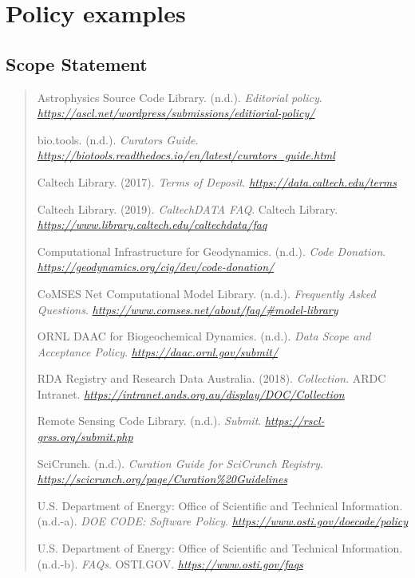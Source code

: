 \documentclass[]{article}
\begin{document}
\newpage
\section{Policy examples}\label{policy-examples}

\subsection{Scope Statement}\label{scope-statement}

\begin{quote}
Astrophysics Source Code Library. (n.d.). \emph{Editorial policy}.
\href{https://ascl.net/wordpress/submissions/editiorial-policy/}{\emph{https://ascl.net/wordpress/submissions/editiorial-policy/}}

bio.tools. (n.d.). \emph{Curators Guide}.
\href{https://biotools.readthedocs.io/en/latest/curators_guide.html}{\emph{https://biotools.readthedocs.io/en/latest/curators\_guide.html}}

Caltech Library. (2017). \emph{Terms of Deposit}.
\href{https://data.caltech.edu/terms}{\emph{https://data.caltech.edu/terms}}

Caltech Library. (2019). \emph{CaltechDATA FAQ}. Caltech Library.
\href{https://www.library.caltech.edu/caltechdata/faq}{\emph{https://www.library.caltech.edu/caltechdata/faq}}

Computational Infrastructure for Geodynamics. (n.d.). \emph{Code
Donation}.
\href{https://geodynamics.org/cig/dev/code-donation/}{\emph{https://geodynamics.org/cig/dev/code-donation/}}

CoMSES Net Computational Model Library. (n.d.). \emph{Frequently Asked
Questions}.
\href{https://www.comses.net/about/faq/\#model-library}{\emph{https://www.comses.net/about/faq/\#model-library}}

ORNL DAAC for Biogeochemical Dynamics. (n.d.). \emph{Data Scope and
Acceptance Policy}.
\href{https://daac.ornl.gov/submit/}{\emph{https://daac.ornl.gov/submit/}}

RDA Registry and Research Data Australia. (2018). \emph{Collection}.
ARDC Intranet.
\href{https://intranet.ands.org.au/display/DOC/Collection}{\emph{https://intranet.ands.org.au/display/DOC/Collection}}

Remote Sensing Code Library. (n.d.). \emph{Submit}.
\href{https://rscl-grss.org/submit.php}{\emph{https://rscl-grss.org/submit.php}}

SciCrunch. (n.d.). \emph{Curation Guide for SciCrunch Registry}.
\href{https://scicrunch.org/page/Curation\%20Guidelines}{\emph{https://scicrunch.org/page/Curation\%20Guidelines}}

U.S. Department of Energy: Office of Scientific and Technical
Information. (n.d.-a). \emph{DOE CODE: Software Policy}.
\href{https://www.osti.gov/doecode/policy}{\emph{https://www.osti.gov/doecode/policy}}

U.S. Department of Energy: Office of Scientific and Technical
Information. (n.d.-b). \emph{FAQs}. OSTI.GOV.
\href{https://www.osti.gov/faqs}{\emph{https://www.osti.gov/faqs}}
\end{quote}
\end{document}
